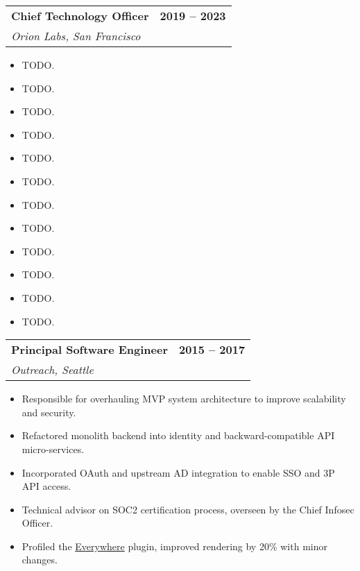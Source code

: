 \documentclass[12pt]{article}
\makeatletter
\newenvironment{justifycolumns}
{\begin{tabular*}{\textwidth}{@{\extracolsep{\fill}}lr@{}}}
{\end{tabular*}}
\newcommand{\row}[2]{#1 & #2 \\}
\newcommand{\rowheading}[2]{\row{\textbf{#1}}{\textbf{#2}}}
\newcommand{\range}[2]{#1 -- #2}
\newcommand{\blockseparation}{\vspace{0.13in}}
\newenvironment{tightbullets}
{\begin{itemize}}
{\end{itemize}}
\newenvironment{bullets}
{\begin{tightbullets}}
{\end{tightbullets} \blockseparation}
\makeatother
\begin{document}
\begin{flushleft}
\hspace{0.2in}
\begin{justifycolumns}
	\hspace{0.1in}
	\rowheading{Chief Technology Officer}{\range{2019}{2023}}
	\hspace{0.1in}
	\row{\emph{Orion Labs, San Francisco}}{}
\end{justifycolumns}
\begin{bullets}
	\item TODO.
	\item TODO.
	\item TODO.
	\item TODO.
	\item TODO.
	\item TODO.
	\item TODO.
	\item TODO.
	\item TODO.
	\item TODO.
	\item TODO.
	\item TODO.
\end{bullets}
\vspace{0.05in}

\begin{justifycolumns}
	\hspace{0.1in}
	\rowheading{Principal Software Engineer}{\range{2015}{2017}}
	\hspace{0.1in}
	\row{\emph{Outreach, Seattle}}{}
\end{justifycolumns}
\begin{bullets}
	\item Responsible for overhauling MVP system architecture to improve scalability and security.
	\item Refactored monolith backend into identity and backward-compatible API micro-services.
	\item Incorporated OAuth and upstream AD integration to enable SSO and 3P API access.
	\item Technical advisor on SOC2 certification process, overseen by the Chief Infosec Officer.
	\item Profiled the \href{https://chrome.google.com/webstore/detail/outreach-everywhere/chmpifjjfpeodjljjadlobceoiflhdid}{Everywhere} plugin, improved rendering by 20\% with minor changes.
\end{bullets}
\vspace{0.05in}


\end{flushleft}
\end{document}
